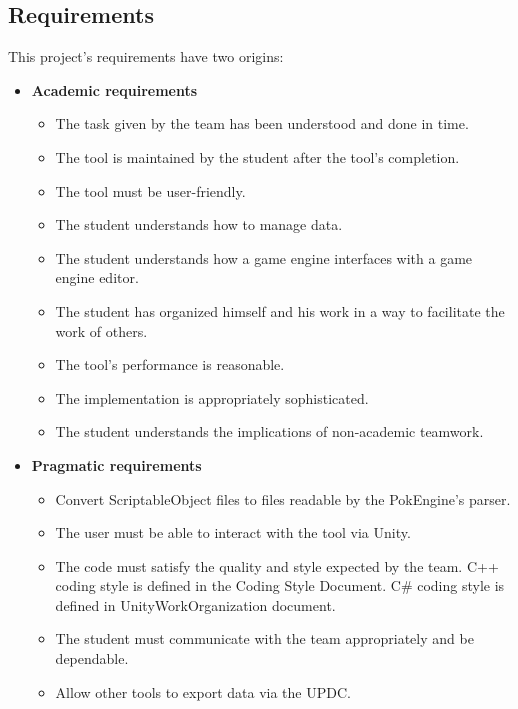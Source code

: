 \documentclass[12pt,a4paper]{article}
\begin{document}
\subsection{Requirements}
This project’s requirements have two origins:
\begin{itemize}
	\item \textbf{Academic requirements}
		\begin{itemize}
			\item The task given by the team has been understood and done in time.
			
			\item The tool is maintained by the student after the tool's completion.
			
			\item The tool must be user-friendly.
			
			\item The student understands how to manage data.
			
			\item The student understands how a game engine interfaces with a game engine editor.
			
			\item The student has organized himself and his work in a way to facilitate the work of others.
			
			\item The tool’s performance is reasonable.
			
			\item The implementation is appropriately sophisticated.
			
			\item The student understands the implications of non-academic teamwork.
			
		\end{itemize}
	\item \textbf{Pragmatic requirements}
		\begin{itemize}
			\item Convert ScriptableObject files to files readable by the PokEngine's parser.
			
			\item The user must be able to interact with the tool via Unity.
			
			\item The code must satisfy the quality and style expected by the team. C++ coding style is defined in the Coding Style Document. C\# coding style is defined in UnityWorkOrganization document.
			
			\item The student must communicate with the team appropriately and be dependable.
			
			\item Allow other tools to export data via the UPDC.
			
	\end{itemize}
\end{itemize}
\newpage
\end{document}
